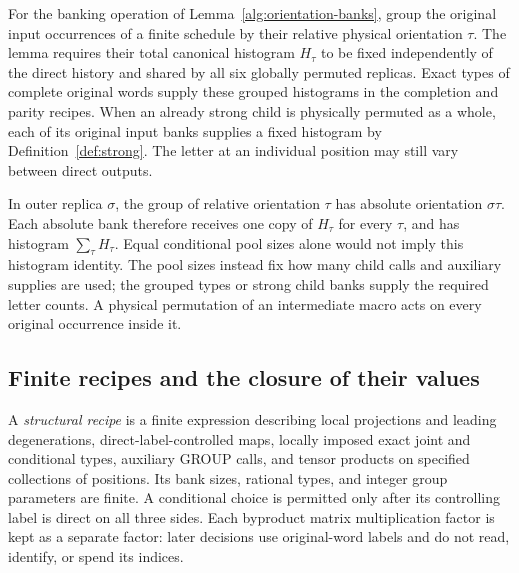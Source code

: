 For the banking operation of Lemma~\ref{alg:orientation-banks}, group the
original input occurrences of a finite schedule by their relative physical
orientation $\tau$.  The lemma requires their total canonical histogram
$H_\tau$ to be fixed independently of the direct history and shared by all
six globally permuted replicas.  Exact types of complete original words
supply these grouped histograms in the completion and parity recipes.
When an already strong child is physically permuted as a whole, each of
its original input banks supplies a fixed histogram by
Definition~\ref{def:strong}.  The letter at an individual position may
still vary between direct outputs.

In outer replica $\sigma$, the group of relative orientation $\tau$ has
absolute orientation $\sigma\tau$.  Each absolute bank therefore receives
one copy of $H_\tau$ for every $\tau$, and has histogram
$\sum_\tau H_\tau$.  Equal conditional pool sizes alone would not imply
this histogram identity.  The pool sizes instead fix how many child calls
and auxiliary supplies are used; the grouped types or strong child banks
supply the required letter counts.  A physical permutation of an
intermediate macro acts on every original occurrence inside it.

\subsection{Finite recipes and the closure of their values}
\label{val:recipes}

A \emph{structural recipe} is a finite expression describing local
projections and leading degenerations, direct-label-controlled maps, locally
imposed exact joint and conditional types, auxiliary GROUP calls, and tensor
products on specified collections of positions.  Its bank sizes, rational types, and
integer group parameters are finite.  A conditional choice is permitted only
after its controlling label is direct on all three sides.  Each byproduct
matrix multiplication factor is kept as a separate factor: later decisions
use original-word labels and do not read, identify, or spend its indices.

